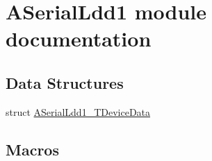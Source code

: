 \hypertarget{group___a_serial_ldd1__module}{\section{A\-Serial\-Ldd1 module documentation}
\label{group___a_serial_ldd1__module}
}
\subsection*{Data Structures}
\begin{DoxyCompactItemize}
\item 
struct \hyperlink{struct_a_serial_ldd1___t_device_data}{A\-Serial\-Ldd1\-\_\-\-T\-Device\-Data}
\end{DoxyCompactItemize}
\subsection*{Macros}
